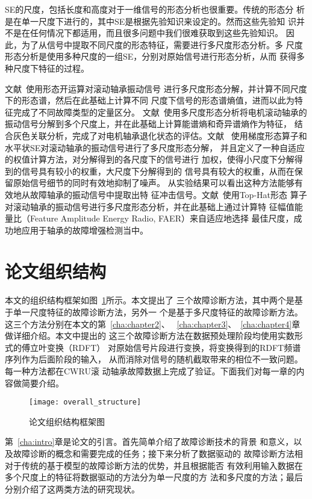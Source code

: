 SE的尺度，包括长度和高度对于一维信号的形态分析也很重要。传统的形态分
析是在单一尺度下进行的，其中SE是根据先验知识来设定的。然而这些先验知
识并不是在任何情况下都适用，而且很多问题中我们很难获取到这些先验知识。
因此，为了从信号中提取不同尺度的形态特征，需要进行多尺度形态分析。多
尺度形态分析是使用多种尺度的一组SE，分别对原始信号进行形态分析，从而
获得多种尺度下特征的过程。

文献~使用形态开运算对滚动轴承振动信号
进行多尺度形态分解，并计算不同尺度下的形态谱，然后在此基础上计算不同
尺度下信号的形态谱熵值，进而以此为特征完成了不同故障类型的定量区分。
文献~使用多尺度形态分析将电机滚动轴承的
振动信号分解到多个尺度上，并在此基础上计算能谱熵和奇异谱熵作为特征，
结合灰色关联分析，完成了对电机轴承退化状态的评估。文献~
使用梯度形态算子和水平状SE对滚动轴承的振动信号进行了多尺度形态分解，
并且定义了一种自适应的权值计算方法，对分解得到的各尺度下的信号进行
加权，使得小尺度下分解得到的信号具有较小的权重，大尺度下分解得到的
信号具有较大的权重，从而在保留原始信号细节的同时有效地抑制了噪声。
从实验结果可以看出这种方法能够有效地从故障轴承的振动信号中提取出特
征冲击信号。文献~使用Top-Hat形态
算子对滚动轴承的振动信号进行多尺度形态分析，并在此基础上通过计算特
征幅值能量比（Feature Amplitude Energy Radio, FAER）来自适应地选择
最佳尺度，成功地应用于轴承的故障增强检测当中。

\section{论文组织结构}

本文的组织结构框架如图~\ref{fig:overall_structure}所示。本文提出了
三个故障诊断方法，其中两个是基于单一尺度特征的故障诊断方法，另外一
个是基于多尺度特征的故障诊断方法。这三个方法分别在本文的第~\ref{cha:chapter2}、
~\ref{cha:chapter3}、~\ref{cha:chapter4}章做详细介绍。本文中提出的
这三个故障诊断方法在数据预处理阶段均使用实数形式的傅立叶变换（RDFT）
对原始信号片段进行变换，将变换得到的RDFT频谱序列作为后面阶段的输入，
从而消除对信号的随机截取带来的相位不一致问题。每一种方法都在CWRU滚
动轴承故障数据上完成了验证。下面我们对每一章的内容做简要介绍。
\begin{figure}[ht]
  \centering
  \texttt{[image: overall\_structure]}
  \caption{论文组织结构框架图}
  \label{fig:overall_structure}
\end{figure}

第~\ref{cha:intro}章是论文的引言。首先简单介绍了故障诊断技术的背景
和意义，以及故障诊断的概念和需要完成的任务；接下来分析了数据驱动的
故障诊断方法相对于传统的基于模型的故障诊断方法的优势，并且根据能否
有效利用输入数据在多个尺度上的特征将数据驱动的方法分为单一尺度的方
法和多尺度的方法；最后分别介绍了这两类方法的研究现状。


